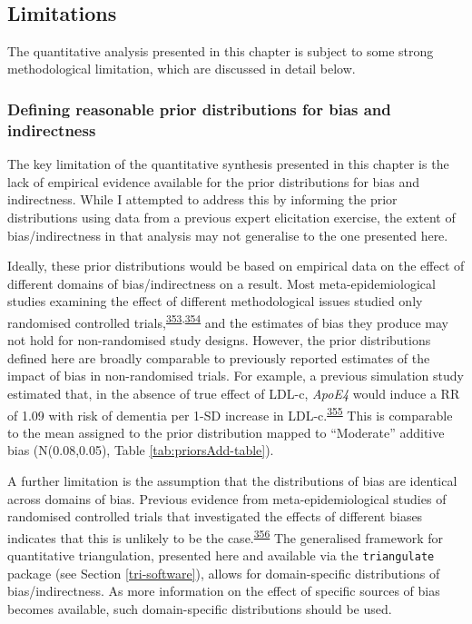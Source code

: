 \documentclass[a4paper, twoside]{templates/ociamthesis}
\begin{document}
~

\hypertarget{limitations-2}{%
\subsection{Limitations}\label{limitations-2}}

The quantitative analysis presented in this chapter is subject to some strong methodological limitation, which are discussed in detail below.

\hypertarget{defining-reasonable-prior-distributions-for-bias-and-indirectness}{%
\subsubsection{Defining reasonable prior distributions for bias and indirectness}\label{defining-reasonable-prior-distributions-for-bias-and-indirectness}}

The key limitation of the quantitative synthesis presented in this chapter is the lack of empirical evidence available for the prior distributions for bias and indirectness. While I attempted to address this by informing the prior distributions using data from a previous expert elicitation exercise, the extent of bias/indirectness in that analysis may not generalise to the one presented here.

Ideally, these prior distributions would be based on empirical data on the effect of different domains of bias/indirectness on a result. Most meta-epidemiological studies examining the effect of different methodological issues studied only randomised controlled trials,\textsuperscript{\protect\hyperlink{ref-amer2021}{353},\protect\hyperlink{ref-page2016}{354}} and the estimates of bias they produce may not hold for non-randomised study designs. However, the prior distributions defined here are broadly comparable to previously reported estimates of the impact of bias in non-randomised trials. For example, a previous simulation study estimated that, in the absence of true effect of LDL-c, \emph{ApoE4} would induce a RR of 1.09 with risk of dementia per 1-SD increase in LDL-c.\textsuperscript{\protect\hyperlink{ref-iwagami2021}{355}} This is comparable to the mean assigned to the prior distribution mapped to ``Moderate'' additive bias (N(0.08,0.05), Table \ref{tab:priorsAdd-table}).

A further limitation is the assumption that the distributions of bias are identical across domains of bias. Previous evidence from meta-epidemiological studies of randomised controlled trials that investigated the effects of different biases indicates that this is unlikely to be the case.\textsuperscript{\protect\hyperlink{ref-savovic2018}{356}} The generalised framework for quantitative triangulation, presented here and available via the \texttt{triangulate} package (see Section \ref{tri-software}), allows for domain-specific distributions of bias/indirectness. As more information on the effect of specific sources of bias becomes available, such domain-specific distributions should be used.
\end{document}
